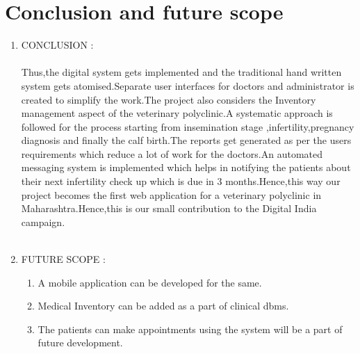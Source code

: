 \documentclass[oneside,a4paper,12pt]{book}
\begin{document}
 \chapter{Conclusion and future scope}
\begin{enumerate}
\item CONCLUSION :\\ \\
Thus,the digital system gets implemented and the traditional hand written system gets atomised.Separate user interfaces for doctors and administrator is created to simplify the work.The project also considers the Inventory management aspect of the veterinary polyclinic.A systematic approach is followed for the process starting from insemination stage ,infertility,pregnancy diagnosis and finally the calf birth.The reports get generated as per the users requirements which reduce a lot of work for the doctors.An automated messaging system is implemented which helps in notifying the patients about their next infertility check up which is due in 3 months.Hence,this way our project becomes the first web application for a veterinary polyclinic in Maharashtra.Hence,this is our small contribution to the Digital India campaign.\\ \\
\item FUTURE SCOPE :
\begin{enumerate}[1.]
\item A mobile application can be developed for the same.
\item Medical Inventory can be added as a part of clinical dbms.
\item The patients can make appointments using the system will be a part of future development.
\end{enumerate}



\end{enumerate}
 
% 



\end{document}
